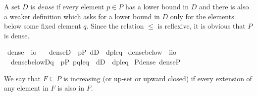 A set $D$ is \emph{dense} if every element $p\in P$ has a lower bound
in $D$ and there is also a weaker definition which asks for a lower
bound in $D$ only for the elements below some fixed element $q$. Since
the relation $\leqslant$ is reflexive, it is obvious that $P$ is
dense.
\begin{isabellebody}
  \isanewline
  \isamarkupfalse%
\ dense\ {\isacharcolon}{\isacharcolon}\ {\isachardoublequoteopen}i{\isasymRightarrow}o{\isachardoublequoteclose}\ \isanewline
\ \ {\isachardoublequoteopen}dense{\isacharparenleft}D{\isacharparenright}\ {\isacharequal}{\isacharequal}\ {\isasymforall}p{\isasymin}P{\isachardot}\ {\isasymexists}d{\isasymin}D\ {\isachardot}\ {\isasymlangle}d{\isacharcomma}p{\isasymrangle}{\isasymin}leq{\isachardoublequoteclose}\isanewline
\isanewline
{}\isamarkupfalse%
\ dense{\isacharunderscore}below\ {\isacharcolon}{\isacharcolon}\ {\isachardoublequoteopen}i{\isasymRightarrow}i{\isasymRightarrow}o{\isachardoublequoteclose}\ \isanewline
\ \ {\isachardoublequoteopen}dense{\isacharunderscore}below{\isacharparenleft}D{\isacharcomma}q{\isacharparenright}\ {\isacharequal}{\isacharequal}\ {\isasymforall}p{\isasymin}P{\isachardot}\ {\isasymlangle}p{\isacharcomma}q{\isasymrangle}{\isasymin}leq\ {\isasymlongrightarrow}\ {\isacharparenleft}{\isasymexists}d{\isasymin}D\ {\isachardot}\ {\isasymlangle}d{\isacharcomma}p{\isasymrangle}{\isasymin}leq{\isacharparenright}{\isachardoublequoteclose}\isanewline
\isanewline
{}\isamarkupfalse%
\ P{\isacharunderscore}dense{\isacharcolon}\ {\isachardoublequoteopen}dense{\isacharparenleft}P{\isacharparenright}{\isachardoublequoteclose}\isanewline
\end{isabellebody}

We say that $F\subseteq P$ is increasing (or up-set or upward closed) if every
extension of any element in $F$ is also in $F$.

